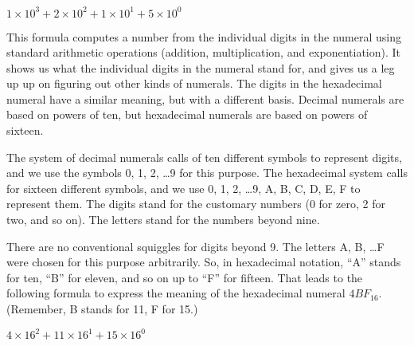 \begin{center}
$1 \times 10^3 + 2 \times 10^2 + 1 \times 10^1 + 5 \times 10^0$
\end{center}

This formula computes a number from the individual digits
in the numeral using standard arithmetic operations
(addition, multiplication, and exponentiation).
It shows us what the individual digits in the numeral stand for,
and gives us a leg up up on figuring out other kinds of numerals.
The digits in the hexadecimal numeral have a similar meaning,
but with a different basis. Decimal numerals are based on
powers of ten, but hexadecimal numerals are based on powers of sixteen.

The system of decimal numerals calls of ten different symbols to represent digits,
and we use the symbols 0, 1, 2, \dots 9 for this purpose.
The hexadecimal system calls for sixteen different symbols,
and we use 0, 1, 2, \dots 9, A, B, C, D, E, F to represent them.
The digits stand for the customary numbers (0 for zero, 2 for two,
and so on). The letters stand for the numbers beyond nine.

There are no conventional squiggles for digits beyond 9.
The letters A, B, \dots F were chosen for this purpose arbitrarily.
So, in hexadecimal notation, ``A'' stands for ten, ``B'' for eleven,
and so on up to ``F'' for fifteen. That leads to the following
formula to express the meaning of the hexadecimal numeral $4BF_{16}$.
(Remember, B stands for 11, F for 15.)
\begin{center}
$4 \times 16^2 + 11 \times 16^1 + 15 \times 16^0$
\end{center}

